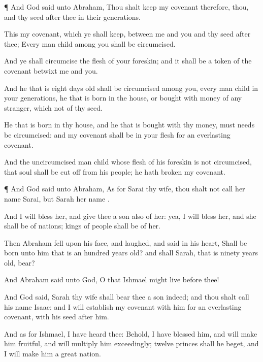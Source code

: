 {\par }{\PP {}¶ And
God
said unto
Abraham, Thou shalt
keep my
covenant therefore, thou, and thy
seed after
thee in their
generations.

This
{} my
covenant, which ye shall
keep, between me and you and thy
seed after
thee; Every man
child among you shall be
circumcised.

And ye shall
circumcise the
flesh of your
foreskin; and it shall be a
token of the
covenant betwixt me and you.

And he that is
eight
days
old shall be
circumcised among you, every man
child in your
generations, he that is
born in the
house, or
bought with
money of any
stranger, which
{} not of thy
seed.

He that is
born in thy
house, and he that is
bought with thy
money, must
needs be
circumcised: and my
covenant shall be in your
flesh for an
everlasting
covenant.

And the
uncircumcised man
child
whose
flesh of his
foreskin is not
circumcised, that
soul shall be cut
off from his
people; he hath
broken my
covenant.


\par }{\PP {}¶ And
God
said unto
Abraham, As for
Sarai thy
wife, thou shalt not
call her
name
Sarai,
but
Sarah
{} her
name
{}.

And I will
bless her, and
give thee a
son also of her: yea, I will
bless her, and she shall be
{} of
nations;
kings of
people shall be of her.

Then
Abraham
fell upon his
face, and
laughed, and
said in his
heart, Shall
{} be
born unto him that is an
hundred
years
old? and shall
Sarah, that is
ninety
years
old,
bear?

And
Abraham
said unto
God, O
that
Ishmael might
live before
thee!

And
God
said,
Sarah thy
wife shall
bear thee a
son
indeed; and thou shalt
call his
name
Isaac: and I will
establish my
covenant with him for an
everlasting
covenant,
{} with his
seed after
him.

And as for
Ishmael, I have heard
thee: Behold, I have
blessed him, and will make him
fruitful, and will
multiply him
exceedingly;
twelve
princes shall he
beget, and I will make
him a
great
nation.

}
